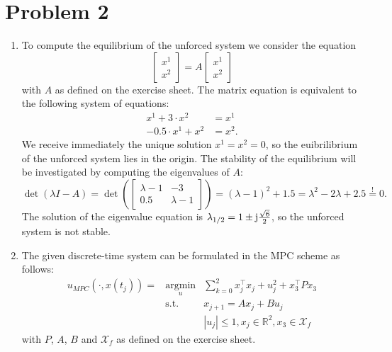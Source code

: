 \documentclass[12pt,pdftex,a4paper]{scrartcl}
\DeclareMathOperator*{\argmin}{argmin}
\begin{document}
\section*{Problem 2}
\begin{enumerate}
    \item To compute the equilibrium of the unforced system we consider the equation
    \begin{equation*}
         \begin{bmatrix}
             x^1 \\ x^2
         \end{bmatrix}
         = A
         \begin{bmatrix}
             x^1 \\ x^2
         \end{bmatrix}
    \end{equation*}
    with $A$ as defined on the exercise sheet. The matrix equation is equivalent to the following system of equations:
    \begin{align*}
         x^1 + 3 \cdot x^2 &= x^1 \\
         -0.5 \cdot x^1 +x^2 &= x^2.
    \end{align*}
    We receive immediately the unique solution $x^1 = x^2 = 0$, so the euibrilibrium of the unforced system lies in the origin. The stability of the equilibrium will be investigated by computing the eigenvalues of $A$:
    \begin{equation*}         
         \det (\lambda I - A) = \det \left(
         \begin{bmatrix}
            \lambda -1 & -3 \\
            0.5 & \lambda -1
         \end{bmatrix}
         \right) = (\lambda -1)^2 +1.5 = \lambda^2 -2 \lambda +2.5 \overset{!}{=} 0.
    \end{equation*}
    The solution of the eigenvalue equation is $\lambda_{1/2} = 1 \pm \im \frac{\sqrt{6}}{2}$, so the unforced system is not stable.
    
    \item The given discrete-time system can be formulated in the MPC scheme as follows:
    \begin{equation} 
    \begin{array}{rcl} 
    u_{MPC} (\cdot , x(t_j)) = &\argmin\limits_u& \sum\limits_{k=0}^2 x_j^\top x_j + u_j^2 +x_3^\top P x_3 \\ 
    &\mathrm{s.t.}& x_{j+1} = A x_j + B u_j \\ 
    && |u_j| \leq 1, x_j \in \mathbb{R}^2, x_3 \in \mathcal{X}_f%
    \end{array}      
    \end{equation}
    with $P$, $A$, $B$ and $\mathcal{X}_f$ as defined on the exercise sheet.
    

\end{enumerate}
\end{document}
